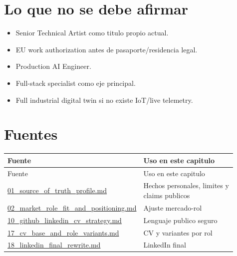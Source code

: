 \section{Lo que no se debe afirmar}


\begin{itemize}
\item Senior Technical Artist como titulo propio actual.
\item EU work authorization antes de pasaporte/residencia legal.
\item Production AI Engineer.
\item Full-stack specialist como eje principal.
\item Full industrial digital twin si no existe IoT/live telemetry.
\end{itemize}


\section{Fuentes}


\begin{center}
\scriptsize
\begin{longtable}{>{\raggedright\arraybackslash}p{0.455\linewidth} >{\raggedright\arraybackslash}p{0.455\linewidth}}
\toprule
Fuente & Uso en este capitulo \\
\midrule
\endfirsthead
\toprule
Fuente & Uso en este capitulo \\
\midrule
\endhead
\href{file:///E:/Laboral/01_source_of_truth_profile.md}{01\_source\_of\_truth\_profile.md} & Hechos personales, limites y claims publicos \\
\href{file:///E:/Laboral/02_market_role_fit_and_positioning.md}{02\_market\_role\_fit\_and\_positioning.md} & Ajuste mercado-rol \\
\href{file:///E:/Laboral/10_github_linkedin_cv_strategy.md}{10\_github\_linkedin\_cv\_strategy.md} & Lenguaje publico seguro \\
\href{file:///E:/Laboral/17_cv_base_and_role_variants.md}{17\_cv\_base\_and\_role\_variants.md} & CV y variantes por rol \\
\href{file:///E:/Laboral/18_linkedin_final_rewrite.md}{18\_linkedin\_final\_rewrite.md} & LinkedIn final \\
\bottomrule
\end{longtable}
\end{center}


